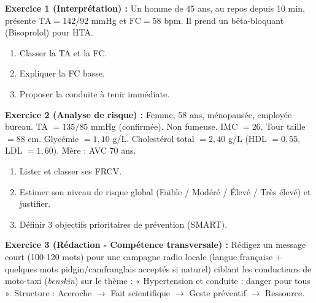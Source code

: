 \documentclass[11pt]{article}
\begin{document}
\begin{exercice}
\textbf{Exercice 1 (Interprétation) :} Un homme de 45 ans, au repos depuis 10 min, présente $\text{TA} = 142/92$ mmHg et $\text{FC} = 58$ bpm. Il prend un bêta-bloquant (Bisoprolol) pour HTA.
\begin{enumerate}
    \item Classer la TA et la FC.
    \item Expliquer la FC basse.
    \item Proposer la conduite à tenir immédiate.
\end{enumerate}

\textbf{Exercice 2 (Analyse de risque) :} Femme, 58 ans, ménopausée, employée bureau. TA $= 135/85$ mmHg (confirmée). Non fumeuse. IMC $= 26$. Tour taille $= 88$ cm. Glycémie $= 1,10$ g/L. Cholestérol total $= 2,40$ g/L (HDL $= 0,55$, LDL $= 1,60$). Mère : AVC 70 ans.
\begin{enumerate}
    \item Lister et classer ses FRCV.
    \item Estimer son niveau de risque global (Faible / Modéré / Élevé / Très élevé) et justifier.
    \item Définir 3 objectifs prioritaires de prévention (SMART).
\end{enumerate}

\textbf{Exercice 3 (Rédaction - Compétence transversale) :} Rédigez un message court (100-120 mots) pour une campagne radio locale (langue française + quelques mots pidgin/camfranglais acceptés si naturel) ciblant les conducteurs de moto-taxi (\emph{benskin}) sur le thème : « Hypertension et conduite : danger pour tous ». Structure : Accroche $\rightarrow$ Fait scientifique $\rightarrow$ Geste préventif $\rightarrow$ Ressource.
\end{exercice}
\end{document}
